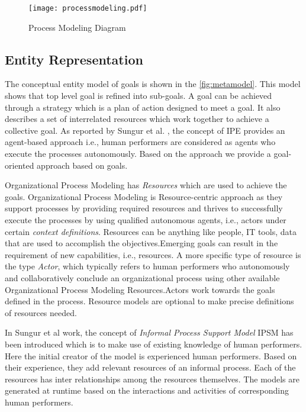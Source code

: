 \begin{figure}
	\centering
	\texttt{[image: processmodeling.pdf]}
	\caption{Process Modeling Diagram}
	\label{fig:processdiagram}
\end{figure}

\subsection{Entity Representation}

 The conceptual entity model of goals is shown in the \ref{fig:metamodel}. This model shows that top level goal is refined into sub-goals. A goal can be achieved through a strategy which is a plan of action designed to meet a goal. It also describes a set of interrelated resources which work together to achieve a collective goal. As reported by Sungur et al. \cite{Sungur2014a}, the concept of IPE provides an agent-based approach i.e., human performers are considered as agents who execute the processes autonomously. Based on the approach \cite{Sungur2014a} we provide a goal-oriented approach based on goals.

 Organizational Process Modeling  has \textit{Resources} which are used to achieve the goals. Organizational Process Modeling is Resource-centric approach as they support processes by providing required resources and thrives to successfully execute the processes by using qualified autonomous agents, i.e., actors under certain \textit{context definitions}.  Resources can be anything like people, IT tools, data that are used to accomplish the objectives.Emerging goals can result in the requirement of new capabilities, i.e., resources. A more specific type of resource is the type \textit{Actor}, which typically refers to human performers who autonomously and collaboratively conclude an organizational process using other available Organizational Process Modeling Resources.Actors work towards the goals defined in the process. Resource models are optional to make precise definitions of resources needed.

 In Sungur et al \cite{Sungur2014a} work, the concept of \textit{Informal Process Support Model} IPSM has been introduced which is to make use of existing knowledge of human performers. Here the initial creator of the model is experienced human performers. Based on their experience, they add relevant  resources of an informal process. Each of the resources has inter relationships among the resources themselves. The models are generated at runtime based on the interactions and activities of corresponding human performers. 

